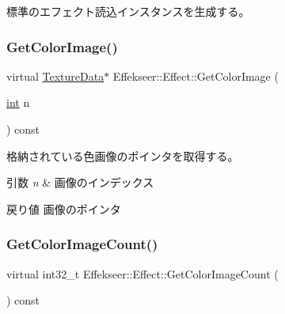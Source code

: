 標準のエフェクト読込インスタンスを生成する。 

\mbox{\label{class_effekseer_1_1_effect_a8dee1d45117ec1dc3909aa20ac942110}} 
\subsubsection{\texorpdfstring{Get\+Color\+Image()}{GetColorImage()}}
{\footnotesize\ttfamily virtual \mbox{\hyperlink{struct_effekseer_1_1_texture_data}{Texture\+Data}}$\ast$ Effekseer\+::\+Effect\+::\+Get\+Color\+Image (\begin{DoxyParamCaption}\item[{\mbox{\hyperlink{namespace_effekseer_ace0abf7c2e6947e519ebe8b54cbcc30a}{int}}}]{n }\end{DoxyParamCaption}) const\hspace{0.3cm}{\ttfamily [pure virtual]}}



格納されている色画像のポインタを取得する。 


\begin{DoxyParams}{引数}
{\em n} & 画像のインデックス \\
\hline
\end{DoxyParams}
\begin{DoxyReturn}{戻り値}
画像のポインタ 
\end{DoxyReturn}
\mbox{\label{class_effekseer_1_1_effect_a50ca0307097782d1bced346e8090a56d}} 
\subsubsection{\texorpdfstring{Get\+Color\+Image\+Count()}{GetColorImageCount()}}
{\footnotesize\ttfamily virtual int32\+\_\+t Effekseer\+::\+Effect\+::\+Get\+Color\+Image\+Count (\begin{DoxyParamCaption}{ }\end{DoxyParamCaption}) const\hspace{0.3cm}{\ttfamily [pure virtual]}}



